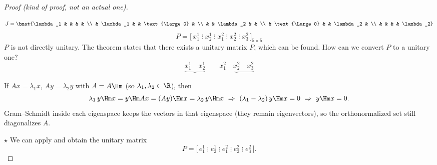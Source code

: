 \begin{proof}[Proof (kind of proof, not an actual one)]
\begin{center}
\begin{tikzpicture}[font=\small]
\end{tikzpicture}
\end{center}
\[
J = \bmat{\lambda_1 & & & & \\ & \lambda_1 & & \text{\Large 0} & \\ & & \lambda_2 & & \\ & \text{\Large 0} & & \lambda_2 & \\ & & & & \lambda_2}
\]
\[
P = \bigl[\, x_1^1 \;\vdots\; x_2^1 \;\vdots\; x_1^2 \;\vdots\; x_2^2 \;\vdots\; x_3^2 \,\bigr]_{5\times 5}
\]
$P$ is not directly unitary. The theorem states that there exists a unitary matrix $P$, which can be found. How can we convert $P$ to a unitary one?
\[
\underbrace{x_1^1\quad x_2^1}\qquad \underbrace{x_1^2\quad x_2^2\quad x_3^2}
\]
\begin{insight}
If $Ax=\lambda_1x$, $Ay=\lambda_2y$ with $A=A\Hm$ (so $\lambda_1,\lambda_2\in\R$), then
\[
\lambda_1\, y\Hm x = y\Hm A x = (A y)\Hm x = \lambda_2\, y\Hm x
\ \Rightarrow\ (\lambda_1-\lambda_2)\,y\Hm x = 0
\ \Rightarrow\ y\Hm x = 0 .
\]
Gram--Schmidt inside each eigenspace keeps the vectors in that eigenspace (they remain eigenvectors), so the orthonormalized set still diagonalizes $A$.
\end{insight}
$\star$ We can apply  and obtain the unitary matrix
\[
P = \bigl[\, e_1^1 \;\vdots\; e_2^1 \;\vdots\; e_1^2 \;\vdots\; e_2^2 \;\vdots\; e_3^2 \,\bigr].
\]
\end{proof}

